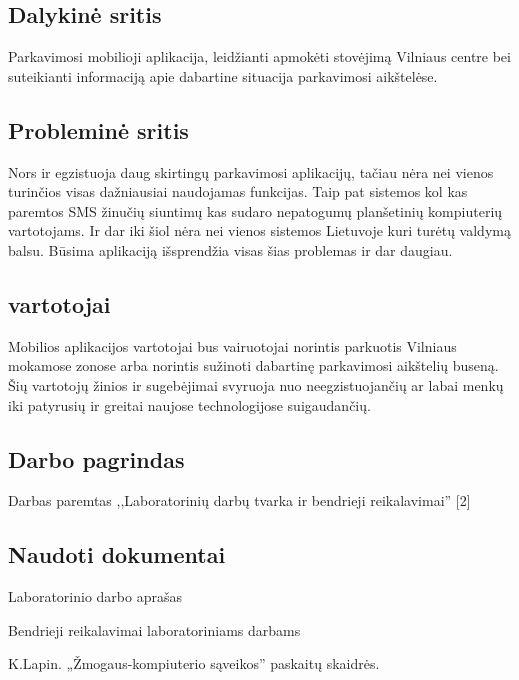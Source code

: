 \documentclass{VUMIFPSkursinis}
\begin{document}
\subsection*{Dalykinė sritis}

Parkavimosi mobilioji aplikacija, leidžianti apmokėti stovėjimą Vilniaus centre bei suteikianti informaciją apie dabartine situacija parkavimosi aikštelėse.

\subsection*{Probleminė sritis}

Nors ir egzistuoja daug skirtingų parkavimosi aplikacijų, tačiau nėra nei vienos turinčios visas dažniausiai naudojamas funkcijas. Taip pat sistemos kol kas paremtos SMS žinučių siuntimų kas sudaro nepatogumų planšetinių kompiuterių vartotojams. Ir dar iki šiol nėra nei vienos sistemos Lietuvoje kuri turėtų valdymą balsu. Būsima aplikaciją išsprendžia visas šias problemas ir dar daugiau.

\subsection*{vartotojai}

Mobilios aplikacijos vartotojai bus vairuotojai norintis parkuotis Vilniaus mokamose zonose arba norintis sužinoti dabartinę parkavimosi aikštelių buseną. Šių vartotojų žinios ir sugebėjimai svyruoja nuo neegzistuojančių ar labai menkų iki patyrusių ir greitai naujose technologijose suigaudančių. 


\subsection*{Darbo pagrindas}

Darbas paremtas ,,Laboratorinių darbų tvarka ir bendrieji reikalavimai'' [2]

\subsection*{Naudoti dokumentai}

\begin{enumerate} [label = {[\arabic*]}]
	\item Laboratorinio darbo aprašas
	\item Bendrieji reikalavimai laboratoriniams darbams
	\item K.Lapin. „Žmogaus-kompiuterio sąveikos” paskaitų skaidrės. 
\end{enumerate}
\end{document}
